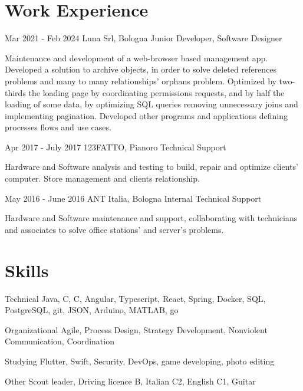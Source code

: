 \documentclass{tccv}
\begin{document}
\section{Work Experience}
\hfill
\begin{eventlist}

      \item{Mar 2021 - Feb 2024}
            {Luna Srl, Bologna}
            {Junior Developer, Software Designer}

      Maintenance and development of a web-browser based management app. Developed a solution to archive objects, in order to solve deleted references problems and many to many relationships' orphans problem.
      Optimized by two-thirds the loading page by coordinating permissions requests, and by half the loading of some data, by optimizing SQL queries removing unnecessary joins and implementing pagination.
      Developed other programs and applications defining processes flows and use cases.

      \item{Apr 2017 - July 2017}
            {123FATTO, Pianoro}
            {Technical Support}

      Hardware and Software analysis and testing to build, repair and optimize clients' computer. Store management and clients relationship.
      \item{May 2016 - June 2016}
            {ANT Italia, Bologna}
            {Internal Technical Support}

      Hardware and Software maintenance and support, collaborating with technicians and associates to solve office stations' and server's problems.
\end{eventlist}

\section{Skills}

\begin{factlist}
      \item{Technical}
            {Java, C, C, Angular, Typescript, React, Spring, Docker, SQL, PostgreSQL, git, JSON, Arduino, MATLAB, go}

      \item{Organizational}
            {Agile, Process Design, Strategy Development, Nonviolent Communication, Coordination}

      \item{Studying}
            {Flutter, Swift, Security, DevOps, game developing, photo editing}

      \item{Other}
            {Scout leader, Driving licence B, Italian C2, English C1, Guitar}
\end{factlist}
\end{document}
